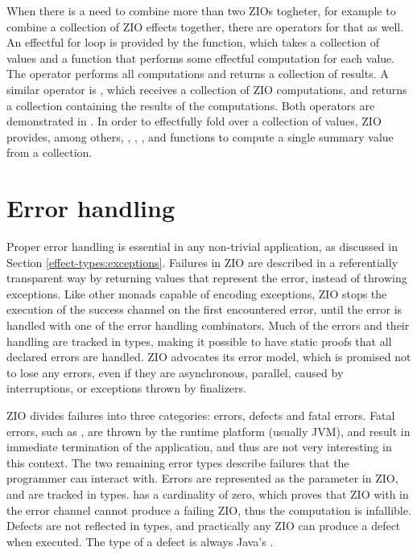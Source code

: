 

When there is a need to combine more than two ZIOs togheter, for example to combine a collection of ZIO effects together, there are operators for that as well. An effectful for loop is provided by the  function, which takes a collection of values and a function that performs some effectful computation for each value. The operator performs all computations and returns a collection of results. A similar operator is , which receives a collection of ZIO computations, and returns a collection containing the results of the computations. Both operators are demonstrated in . In order to effectfully fold over a collection of values, ZIO provides, among others, , , , and   functions to compute a single summary value from a collection.





\section{Error handling} \label{zio:error-handling}
Proper error handling is essential in any non-trivial application, as discussed in Section \ref{effect-types:exceptions}. Failures in ZIO are described in a referentially transparent way by returning values that represent the error, instead of throwing exceptions. Like other monads capable of encoding exceptions, ZIO stops the execution of the success channel on the first encountered error, until the error is handled with one of the error handling combinators. Much of the errors and their handling are tracked in types, making it possible to have static proofs that all declared errors are handled. ZIO advocates its error model, which is promised not to lose any errors, even if they are asynchronous, parallel, caused by interruptions, or exceptions thrown by finalizers.

ZIO divides failures into three categories: errors, defects and fatal errors. Fatal errors, such as , are thrown by the runtime platform (usually JVM), and result in immediate termination of the application, and thus are not very interesting in this context. The two remaining error types describe failures that the programmer can interact with. Errors are represented as the  parameter in ZIO, and are tracked in types.  has a cardinality of zero, which proves that ZIO with  in the error channel cannot produce a failing ZIO, thus the computation is infallible. Defects are not reflected in types, and practically any ZIO can produce a defect when executed. The type of a defect is always Java's .

